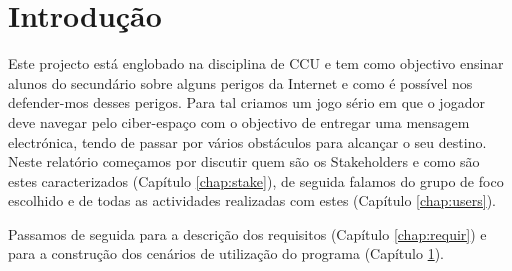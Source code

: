 \chapter{Introdução}
\label{chap:intro} 
Este projecto está englobado na disciplina de \ac{CCU} e tem como objectivo ensinar alunos do secundário sobre alguns perigos da Internet e como é possível nos defender-mos desses perigos.
Para tal criamos um jogo sério em que o jogador deve navegar pelo ciber-espaço com o objectivo de entregar uma mensagem electrónica, tendo de passar por vários obstáculos para alcançar o seu destino.
\newline
Neste relatório começamos por discutir quem são os Stakeholders e como são estes caracterizados (Capítulo \ref{chap:stake}), de seguida falamos do grupo de foco escolhido e de todas as actividades realizadas com estes (Capítulo \ref{chap:users}).

Passamos de seguida para a descrição dos requisitos (Capítulo \ref{chap:requir}) e para a construção dos cenários de utilização do programa (Capítulo \ref{chap:intro}).